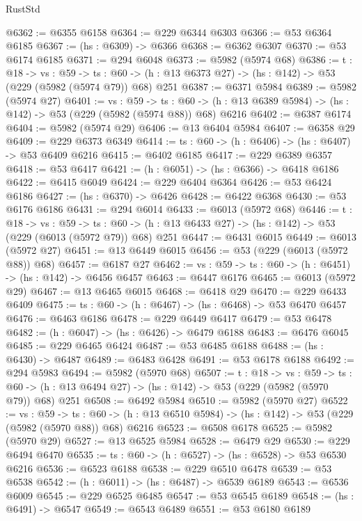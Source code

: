 \begin{lexlean}{RustStd}
\begin{coremodule}
@6362 := @6355 @6158
@6364 := @229 @6344 @6303
@6366 := @53 @6364 @6185
@6367 := (hs : @6309) -> @6366
@6368 := @6362 @6307
@6370 := @53 @6174 @6185
@6371 := @294 @6048
@6373 := @5982 (@5974 @68)
@6386 := {t : @18} ->
  {vs : @59} ->
  {ts : @60} -> (h : @13 @6373 @27) -> (hs : @142) -> @53 (@229 (@5982 (@5974 @79)) @68) @251
@6387 := @6371 @5984
@6389 := @5982 (@5974 @27)
@6401 := {vs : @59} ->
  {ts : @60} -> (h : @13 @6389 @5984) -> (hs : @142) -> @53 (@229 (@5982 (@5974 @88)) @68) @6216
@6402 := @6387 @6174
@6404 := @5982 (@5974 @29)
@6406 := @13 @6404 @5984
@6407 := @6358 @29
@6409 := @229 @6373 @6349
@6414 := {ts : @60} -> (h : @6406) -> (hs : @6407) -> @53 @6409 @6216
@6415 := @6402 @6185
@6417 := @229 @6389 @6357
@6418 := @53 @6417
@6421 := (h : @6051) -> (hs : @6366) -> @6418 @6186
@6422 := @6415 @6049
@6424 := @229 @6404 @6364
@6426 := @53 @6424 @6186
@6427 := (hs : @6370) -> @6426
@6428 := @6422 @6368
@6430 := @53 @6176 @6186
@6431 := @294 @6014
@6433 := @6013 (@5972 @68)
@6446 := {t : @18} ->
  {vs : @59} ->
  {ts : @60} -> (h : @13 @6433 @27) -> (hs : @142) -> @53 (@229 (@6013 (@5972 @79)) @68) @251
@6447 := @6431 @6015
@6449 := @6013 (@5972 @27)
@6451 := @13 @6449 @6015
@6456 := @53 (@229 (@6013 (@5972 @88)) @68)
@6457 := @6187 @27
@6462 := {vs : @59} -> {ts : @60} -> (h : @6451) -> (hs : @142) -> @6456 @6457
@6463 := @6447 @6176
@6465 := @6013 (@5972 @29)
@6467 := @13 @6465 @6015
@6468 := @6418 @29
@6470 := @229 @6433 @6409
@6475 := {ts : @60} -> (h : @6467) -> (hs : @6468) -> @53 @6470 @6457
@6476 := @6463 @6186
@6478 := @229 @6449 @6417
@6479 := @53 @6478
@6482 := (h : @6047) -> (hs : @6426) -> @6479 @6188
@6483 := @6476 @6045
@6485 := @229 @6465 @6424
@6487 := @53 @6485 @6188
@6488 := (hs : @6430) -> @6487
@6489 := @6483 @6428
@6491 := @53 @6178 @6188
@6492 := @294 @5983
@6494 := @5982 (@5970 @68)
@6507 := {t : @18} ->
  {vs : @59} ->
  {ts : @60} -> (h : @13 @6494 @27) -> (hs : @142) -> @53 (@229 (@5982 (@5970 @79)) @68) @251
@6508 := @6492 @5984
@6510 := @5982 (@5970 @27)
@6522 := {vs : @59} ->
  {ts : @60} -> (h : @13 @6510 @5984) -> (hs : @142) -> @53 (@229 (@5982 (@5970 @88)) @68) @6216
@6523 := @6508 @6178
@6525 := @5982 (@5970 @29)
@6527 := @13 @6525 @5984
@6528 := @6479 @29
@6530 := @229 @6494 @6470
@6535 := {ts : @60} -> (h : @6527) -> (hs : @6528) -> @53 @6530 @6216
@6536 := @6523 @6188
@6538 := @229 @6510 @6478
@6539 := @53 @6538
@6542 := (h : @6011) -> (hs : @6487) -> @6539 @6189
@6543 := @6536 @6009
@6545 := @229 @6525 @6485
@6547 := @53 @6545 @6189
@6548 := (hs : @6491) -> @6547
@6549 := @6543 @6489
@6551 := @53 @6180 @6189

\end{coremodule}
\end{lexlean}
